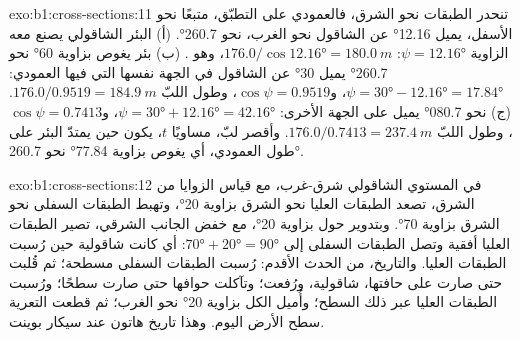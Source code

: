 \begin{solution}{exo:b1:cross-sections:11}
تنحدر الطبقات نحو الشرق، فالعمودي على التطبّق، متبعًا نحو الأسفل، يميل \ang{12.16} عن الشاقول نحو الغرب، نحو \ang{260.7}.
(أ) البئر الشاقولي يصنع معه الزاوية $\psi = \ang{12.16}$: $176.0/\cos\ang{12.16} = \qty{180.0}{m}$، وهو . (ب) بئر يغوص بزاوية \ang{60} نحو \ang{260.7} يميل \ang{30} عن الشاقول في الجهة نفسها التي فيها العمودي: $\psi = \ang{30} - \ang{12.16} =
\ang{17.84}$، و$\cos\psi = 0.9519$، وطول اللبّ $176.0/0.9519 =
\qty{184.9}{m}$. (ج) نحو \ang{080.7} يميل على الجهة الأخرى: $\psi = \ang{30} + \ang{12.16} = \ang{42.16}$، و$\cos\psi = 0.7413$، وطول اللبّ $176.0/0.7413 = \qty{237.4}{m}$. وأقصر لبّ، مساويًا $t$، يكون حين يمتدّ البئر على طول العمودي، أي يغوص بزاوية \ang{77.84} نحو \ang{260.7}.
\end{solution}

\begin{solution}{exo:b1:cross-sections:12}
في المستوي الشاقولي شرق-غرب، مع قياس الزوايا من الشرق، تصعد الطبقات العليا نحو الشرق بزاوية \ang{20}، وتهبط الطبقات السفلى نحو الشرق بزاوية \ang{70}. وبتدوير  حول  بزاوية \ang{20}، مع خفض الجانب الشرقي، تصير الطبقات العليا أفقية وتصل الطبقات السفلى إلى $\ang{70} + \ang{20} = \ang{90}$: أي كانت شاقولية حين رُسبت الطبقات العليا. والتاريخ، من الحدث الأقدم: رُسبت الطبقات السفلى مسطحة؛ ثم قُلبت حتى صارت على حافتها، شاقولية، ورُفعت؛ وتآكلت حوافها حتى صارت سطحًا؛ ورُسبت الطبقات العليا عبر ذلك السطح؛ وأُميل الكل بزاوية \ang{20} نحو الغرب؛ ثم قطعت التعرية سطح الأرض اليوم. وهذا تاريخ  هاتون عند سيكار بوينت.
\end{solution}

